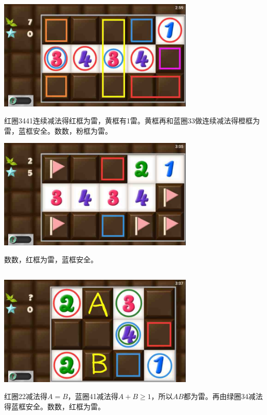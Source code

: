 \subsection{} %
\begin{center}
    \includegraphics[width=0.7\textwidth]{puzzlelow/37-1.jpg}
\end{center}
红圈3441连续减法得红框为雷，黄框有1雷。黄框再和蓝圈33做连续减法得橙框为雷，蓝框安全。数数，粉框为雷。
\begin{center}
    \includegraphics[width=0.7\textwidth]{puzzlelow/37-2.jpg}
\end{center}
数数，红框为雷，蓝框安全。

\subsection{} %
\begin{center}
    \includegraphics[width=0.7\textwidth]{puzzlelow/38-1.jpg}
\end{center}
红圈22减法得$A=B$，蓝圈41减法得$A+B\ge 1$，所以$AB$都为雷。再由绿圈34减法得蓝框安全。数数，红框为雷。

